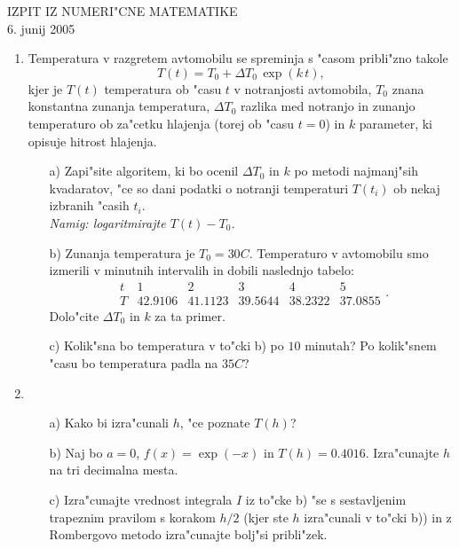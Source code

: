 \documentclass[12pt,a4paper]{article}
\begin{document}
\begin{center}
  IZPIT IZ NUMERI"CNE MATEMATIKE\\
  6. junij 2005
\end{center}
\vspace{1cm}

\begin{enumerate}
  \item Temperatura v razgretem avtomobilu se spreminja s 
    "casom pribli"zno takole
    $$T(t)=T_0+\Delta T_0\,\exp(k\,t),$$
    kjer je $T(t)$ temperatura ob
    "casu $t$ v notranjosti avtomobila, $T_0$ znana konstantna zunanja
    temperatura, $\Delta T_0$ razlika med notranjo in zunanjo
    temperaturo ob za"cetku hlajenja (torej ob "casu $t=0$) in $k$
    parameter, ki opisuje hitrost hlajenja.
  \begin{itemize}
    \item[a)] Zapi"site algoritem, ki bo ocenil $\Delta T_0$ in $k$
      po metodi najmanj"sih kvadaratov, "ce so dani podatki o 
      notranji temperaturi $T(t_i)$ ob nekaj izbranih "casih $t_i$.\\
      {\sl Namig: logaritmirajte $T(t)-T_0$.}
    \item[b)] Zunanja temperatura je $T_0=30C$. Temperaturo v 
    avtomobilu smo izmerili v minutnih intervalih in dobili naslednjo
    tabelo:%
    $$
      \begin{array}{c|ccccc}
        t & 1 & 2 & 3 & 4 & 5\\ \hline
        T & 42.9106 & 41.1123 & 39.5644 & 38.2322 & 37.0855
      \end{array}.
    $$
    Dolo"cite $\Delta T_0$ in $k$ za ta primer.
    \item[c)] Kolik"sna bo temperatura v to"cki b) po $10$ minutah?
      Po kolik"snem "casu bo temperatura padla na $35C$?
  \end{itemize}
  \item 
    \begin{itemize}
      Integral $I=\int_{a}^{a+h} f(x)\,dx$ ra"cunamo z enostavnim
      trapeznim pravilom s korakom $h$, torej
      $$ I\approx T(h):=\frac{h}{2}\left(f(a)+f(a+h)\right).$$
     \item[a)] Kako bi izra"cunali $h$, "ce poznate $T(h)$?
     \item[b)] Naj bo $a=0$, $f(x)=\exp(-x)$ in $T(h)=0.4016$.
       Izra"cunajte $h$ na tri decimalna mesta.
     \item[c)] Izra"cunajte vrednost integrala $I$ iz to"cke b) "se s
       sestavljenim tra\-pez\-nim pravilom s korakom $h/2$ (kjer ste
       $h$ 
       izra"cunali v to"cki b)) in z Rombergovo metodo izra"cunajte
       bolj"si pribli"zek.
    \end{itemize}
\end{enumerate}
\end{document}
